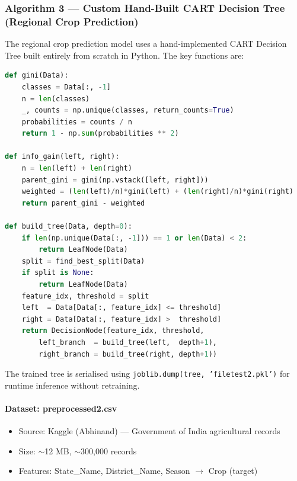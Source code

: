 \subsubsection{Algorithm 3 --- Custom Hand-Built CART Decision Tree (Regional Crop Prediction)}

The regional crop prediction model uses a hand-implemented CART Decision Tree built entirely from scratch in Python. The key functions are:

\begin{lstlisting}[language=Python, caption={Core CART Functions}, label={lst:cart}]
def gini(Data):
    classes = Data[:, -1]
    n = len(classes)
    _, counts = np.unique(classes, return_counts=True)
    probabilities = counts / n
    return 1 - np.sum(probabilities ** 2)

def info_gain(left, right):
    n = len(left) + len(right)
    parent_gini = gini(np.vstack([left, right]))
    weighted = (len(left)/n)*gini(left) + (len(right)/n)*gini(right)
    return parent_gini - weighted

def build_tree(Data, depth=0):
    if len(np.unique(Data[:, -1])) == 1 or len(Data) < 2:
        return LeafNode(Data)
    split = find_best_split(Data)
    if split is None:
        return LeafNode(Data)
    feature_idx, threshold = split
    left  = Data[Data[:, feature_idx] <= threshold]
    right = Data[Data[:, feature_idx] >  threshold]
    return DecisionNode(feature_idx, threshold,
        left_branch  = build_tree(left,  depth+1),
        right_branch = build_tree(right, depth+1))
\end{lstlisting}

The trained tree is serialised using \texttt{joblib.dump(tree, 'filetest2.pkl')} for runtime inference without retraining.

\paragraph{Dataset: preprocessed2.csv}
\begin{itemize}
    \item Source: Kaggle (Abhinand) --- Government of India agricultural records
    \item Size: $\sim$12 MB, $\sim$300,000 records
    \item Features: State\_Name, District\_Name, Season $\rightarrow$ Crop (target)
\end{itemize}

